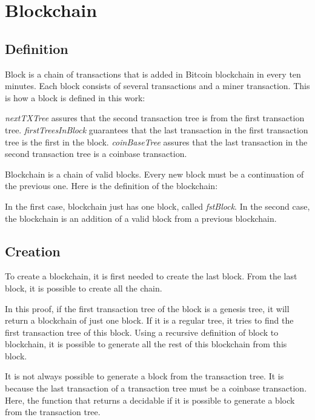 \section{Blockchain}

\subsection{Definition}

Block is a chain of transactions that is added in Bitcoin blockchain in every ten minutes.
Each block consists of several transactions and a miner transaction.
This is how a block is defined in this work:


\emph{nextTXTree} assures that the second transaction tree is from the first transaction tree.
\emph{firstTreesInBlock} guarantees that the last transaction in the first transaction tree
is the first in the block.
\emph{coinBaseTree} assures that the last transaction in the second transaction tree is
a coinbase transaction.

Blockchain is a chain of valid blocks.
Every new block must be a continuation of the previous one.
Here is the definition of the blockchain:


In the first case, blockchain just has one block, called \emph{fstBlock}.
In the second case, the blockchain is an addition of a valid block from a previous blockchain.

\subsection{Creation}

To create a blockchain, it is first needed to create the last block.
From the last block, it is possible to create all the chain.


In this proof, if the first transaction tree of the block is a genesis tree,
it will return a blockchain of just one block.
If it is a regular tree, it tries to find the first transaction tree of this block.
Using a recursive definition of block to blockchain,
it is possible to generate all the rest of this blockchain from this block.

It is not always possible to generate a block from the transaction tree.
It is because the last transaction of a transaction tree must be a coinbase transaction.
Here, the function that returns a decidable if it is possible to generate a block from
the transaction tree.

